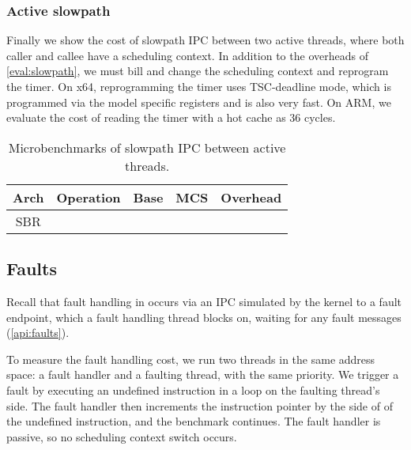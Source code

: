 \subsubsection{Active slowpath}

Finally we show the cost of slowpath IPC between two active threads, where both caller and
callee have a scheduling context. In addition to the
overheads of \cref{eval:slowpath}, we must bill and change the scheduling context and reprogram the
timer. On x64, reprogramming the timer uses \gls{TSC}-deadline mode, which is programmed via the
model specific registers and is also very fast. On ARM, we evaluate the cost of reading the timer
with a hot cache as 36 cycles. 

\begin{table}[hb]\centering
\begin{tabular}{|c|l| r@{~}l | r@{~}l |r@{~}r|}\hline
\textbf{Arch}           & \multicolumn{1}{c|}{\textbf{Operation}}
                                & \multicolumn{2}{c|}{\textbf{Base}}
                                & \multicolumn{2}{c|}{\textbf{MCS}}
                                & \multicolumn{2}{c|}{\textbf{Overhead}} \\ \hline
\multirow{2}{*}{SBR}

\hline
\multirow{2}{*}{ODX}

\hline
\multirow{2}{*}{x64}

\hline
\end{tabular}
\caption{Microbenchmarks of \selfour slowpath \gls{IPC} between active threads.}
\label{t:slowpath-ipc-active-micro}
\end{table}



\subsection{Faults}

Recall that fault handling in \selfour occurs via an \gls{IPC} simulated by the kernel to a fault
endpoint, which a fault handling thread blocks on, waiting for any fault messages
(\cref{api:faults}). 

To measure the fault handling cost, we run two threads in the same address space: a fault handler
and a faulting thread, with the same priority.
We trigger a fault by executing an undefined instruction in a loop on the faulting thread's
side. The fault handler then increments the instruction pointer by the side of of the undefined
instruction, and the benchmark continues. The fault handler is passive, so no scheduling context
switch occurs. 


